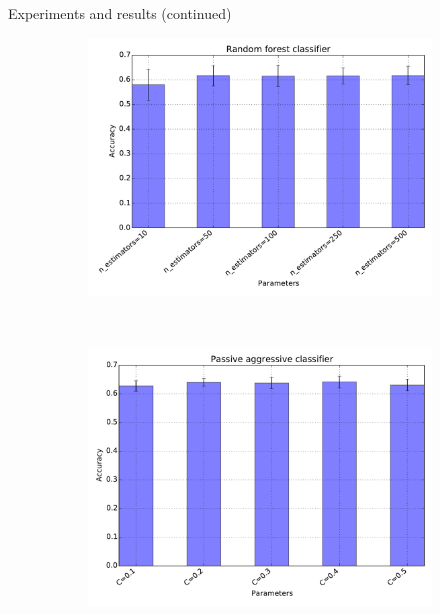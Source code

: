 \documentclass[t,11pt]{beamer}
\begin{document}
\begin{frame}[fragile]{Experiments and results (continued)}
\vspace*{-26pt}
  \begin{figure}
    \centering
    \begin{subfigure}[b]{0.6\textwidth}
      \centering
      \includegraphics[width=\textwidth]{../plots/experiment_results-Random_forest_classifier.pdf}
    \end{subfigure}~%
    \begin{subfigure}[b]{0.4\textwidth}
      \includegraphics[width=\textwidth]{../plots/experiment_results-Passive_aggressive_classifier.pdf}\\

\end{subfigure}
\end{figure}
\end{frame}
\end{document}
